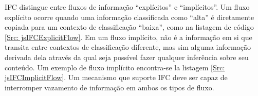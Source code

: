 IFC distingue entre fluxos de informação ``explícitos'' e ``implícitos''. Um fluxo explícito ocorre quando uma informação classificada como ``alta'' é diretamente copiada para um contexto de classificação ``baixa'', como na listagem de código \ref{Src: jsIFCExplicitFlow}. Em um fluxo implícito, não é a informação em si que transita entre contextos de classificação diferente, mas sim alguma informação derivada dela através da qual seja possível fazer qualquer inferência sobre seu conteúdo. Um exemplo de fluxo implícito encontra-se la listagem \ref{Src: jsIFCImplicitFlow}. Um mecanismo que suporte IFC deve ser capaz de interromper vazamento de informação em ambos os tipos de fluxo.



